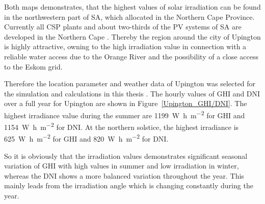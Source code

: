 Both maps demonstrates, that the highest values of solar irradiation can be found in the northwestern part of SA, which allocated in the Northern Cape Province. Currently all CSP plants and about two-thirds of the PV systems of SA are developed in the Northern Cape \cite{Forder2015}. Thereby the region around the city of Upington is highly attractive, owning to the high irradiation value in connection with a reliable water access due to the Orange River and the possibility of a close access to the Eskom grid. 

Therefore the location parameter and weather data of Upington was selected for the simulation and calculations in this thesis \cite{WhiteBoxTechnologies2015}. The hourly values of GHI and DNI over a full year for Upington are shown in Figure~\ref{Upington_GHI/DNI}. The highest irradiance value during the summer are \SI{1199}{\watt\hour\per\square\metre} for GHI and \SI{1154}{\watt\hour\per\square\metre} for DNI. At the northern solstice, the highest irradiance is \SI{625}{\watt\hour\per\square\metre} for GHI and \SI{820}{\watt\hour\per\square\metre} for DNI. 

So it is obviously that the irradiation values demonstrates significant seasonal variation of GHI with high values in summer and low irradiation in winter, whereas the DNI shows a more balanced variation throughout the year. This mainly leads from the irradiation angle which is changing constantly during the year. 

